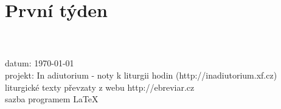 \documentclass[12pt, twoside, a4paper]{article}
\newcommand{\cervene}[1]{%
  \textcolor{BrickRed}{#1}}
\newcommand{\nadpisTyden}[1]{%
  {\textsc{\Large \cervene{#1}}}}
\begin{document}
\section{První týden}



\\
\\
\noindent datum: \today \\
projekt: In adiutorium - noty k liturgii hodin (http://inadiutorium.xf.cz)\\
liturgické texty převzaty z webu http://ebreviar.cz\\
sazba programem \LaTeX
\end{document}
